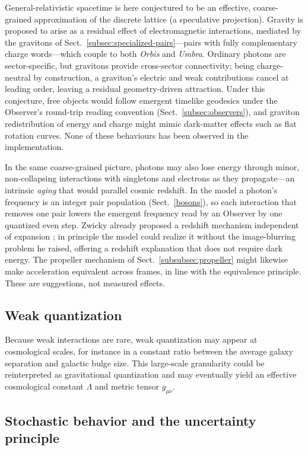 \documentclass{ijuc}
\begin{document}
General-relativistic spacetime is here conjectured to be an effective, coarse-grained approximation of the discrete lattice (a speculative projection). Gravity is proposed to arise as a residual effect of electromagnetic interactions, mediated by the gravitons of Sect.~\ref{subsec:specialized-pairs}---pairs with fully complementary charge words---which couple to both \emph{Orbis} and \emph{Umbra}. Ordinary photons are sector-specific, but gravitons provide cross-sector connectivity; being charge-neutral by construction, a graviton's electric and weak contributions cancel at leading order, leaving a residual geometry-driven attraction. Under this conjecture, free objects would follow emergent timelike geodesics under the Observer's round-trip reading convention (Sect.~\ref{subsec:observers}), and graviton redistribution of energy and charge might mimic dark-matter effects such as flat rotation curves. None of these behaviours has been observed in the implementation.

In the same coarse-grained picture, photons may also lose energy through minor, non-collapsing interactions with singletons and electrons as they propagate---an intrinsic \textit{aging} that would parallel cosmic redshift. In the model a photon's frequency is an integer pair population (Sect.~\ref{bosons}), so each interaction that removes one pair lowers the emergent frequency read by an Observer by one quantized even step. Zwicky already proposed a redshift mechanism independent of expansion \cite{zwicky1929redshift}; in principle the model could realize it without the image-blurring problem he raised, offering a redshift explanation that does not require dark energy. The propeller mechanism of Sect.~\ref{subsubsec:propeller} might likewise make acceleration equivalent across frames, in line with the equivalence principle. These are suggestions, not measured effects.

\subsection{Weak quantization}
Because weak interactions are rare, weak quantization may appear at cosmological scales, for instance in a constant ratio between the average galaxy separation and galactic bulge size. This large-scale granularity could be reinterpreted as gravitational quantization and may eventually yield an effective cosmological constant $\Lambda$ and metric tensor $g_{\mu\nu}$.

\subsection{Stochastic behavior and the uncertainty principle}
\end{document}
